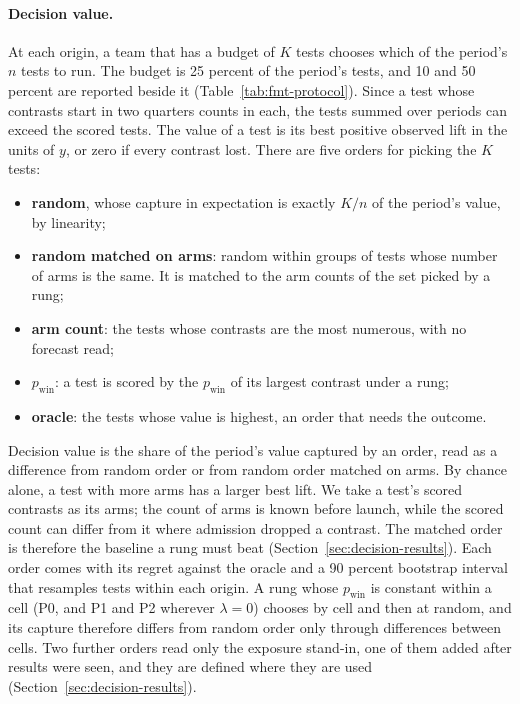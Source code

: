 \documentclass[sigconf,nonacm]{acmart}
\newcommand{\pwin}{p_{\mathrm{win}}}
\begin{document}
\paragraph{Decision value.} At each origin, a team that has a budget of $K$ tests chooses which of the period's $n$ tests to run. The budget is 25 percent of the period's tests, and 10 and 50 percent are reported beside it (Table~\ref{tab:fmt-protocol}). Since a test whose contrasts start in two quarters counts in each, the tests summed over periods can exceed the scored tests. The value of a test is its best positive observed lift in the units of $y$, or zero if every contrast lost. There are five orders for picking the $K$ tests:
\begin{itemize}
\item \textbf{random}, whose capture in expectation is exactly $K/n$ of the period's value, by linearity;
\item \textbf{random matched on arms}: random within groups of tests whose number of arms is the same. It is matched to the arm counts of the set picked by a rung;
\item \textbf{arm count}: the tests whose contrasts are the most numerous, with no forecast read;
\item \textbf{$\pwin$}: a test is scored by the $\pwin$ of its largest contrast under a rung;
\item \textbf{oracle}: the tests whose value is highest, an order that needs the outcome.
\end{itemize}
Decision value is the share of the period's value captured by an order, read as a difference from random order or from random order matched on arms. By chance alone, a test with more arms has a larger best lift. We take a test's scored contrasts as its arms; the count of arms is known before launch, while the scored count can differ from it where admission dropped a contrast. The matched order is therefore the baseline a rung must beat (Section~\ref{sec:decision-results}). Each order comes with its regret against the oracle and a 90 percent bootstrap interval that resamples tests within each origin. A rung whose $\pwin$ is constant within a cell (P0, and P1 and P2 wherever $\lambda = 0$) chooses by cell and then at random, and its capture therefore differs from random order only through differences between cells. Two further orders read only the exposure stand-in, one of them added after results were seen, and they are defined where they are used (Section~\ref{sec:decision-results}).
\end{document}
